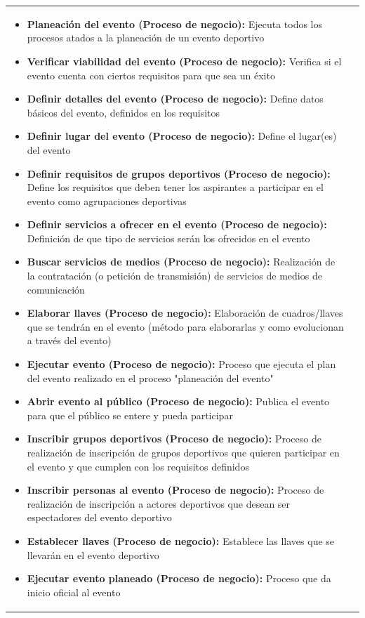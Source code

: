 \begin{table}[!htb]
\begin{center}
{\begin{tabular}{|p{7cm}|p{4cm}|}
\begin{itemize}
				\item \textbf{Planeación del evento (Proceso de negocio):} Ejecuta todos los procesos atados a la planeación de un evento deportivo
				\item \textbf{Verificar viabilidad del evento (Proceso de negocio):} Verifica si el evento cuenta con ciertos requisitos para que sea un éxito
				\item \textbf{Definir detalles del evento (Proceso de negocio):} Define datos básicos del evento, definidos en los requisitos 
				\item \textbf{Definir lugar del evento (Proceso de negocio):} Define el lugar(es) del evento
				\item \textbf{Definir requisitos de grupos deportivos (Proceso de negocio):} Define los requisitos que deben tener los aspirantes a participar en el evento como agrupaciones deportivas
				\item \textbf{Definir servicios a ofrecer en el evento (Proceso de negocio):} Definición de que tipo de servicios serán los ofrecidos en el evento
				\item \textbf{Buscar servicios de medios (Proceso de negocio):} Realización de la contratación (o petición de transmisión) de servicios de medios de comunicación
				\item \textbf{Elaborar llaves (Proceso de negocio):} Elaboración de cuadros/llaves que se tendrán en el evento (método para elaborarlas y como evolucionan a través del evento)
				\item \textbf{Ejecutar evento (Proceso de negocio):} Proceso que ejecuta el plan del evento realizado en el proceso "planeación del evento"
				\item \textbf{Abrir evento al público (Proceso de negocio):} Publica el evento para que el público se entere y pueda participar
				\item \textbf{Inscribir grupos deportivos (Proceso de negocio):} Proceso de realización de inscripción de grupos deportivos que quieren participar en el evento y que cumplen con los requisitos definidos
				\item \textbf{Inscribir personas al evento (Proceso de negocio):} Proceso de realización de inscripción a actores deportivos que desean ser espectadores del evento deportivo
				\item \textbf{Establecer llaves (Proceso de negocio):} Establece las llaves que se llevarán en el evento deportivo
				\item \textbf{Ejecutar evento planeado (Proceso de negocio):} Proceso que da inicio oficial al evento

\end{itemize}
\end{tabular}}
\end{center}
\end{table}
